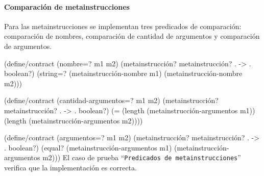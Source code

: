 \documentclass[10pt,oneside,openany,letterpaper]{book}
\begin{document}
\paragraph{Comparación de metainstrucciones} Para las metainstrucciones se implementan tres predicados de comparación: comparación de nombres, comparación de cantidad de argumentos y comparación de argumentos.

\nwenddocs{}\endmoddef
(define/contract (nombre=? m1 m2)
  (metainstrucción? metainstrucción? . -> . boolean?)
  (string=? (metainstrucción-nombre m1)
            (metainstrucción-nombre m2)))

(define/contract (cantidad-argumentos=? m1 m2)
  (metainstrucción? metainstrucción? . -> . boolean?)
  (= (length (metainstrucción-argumentos m1))
     (length (metainstrucción-argumentos m2))))

(define/contract (argumentos=? m1 m2)
  (metainstrucción? metainstrucción? . -> . boolean?)
  (equal? (metainstrucción-argumentos m1)
          (metainstrucción-argumentos m2)))
\eatline
{}\nwendcode{}\nwdocspar
El caso de prueba ``{\tt{}Predicados\ de\ \protect{}metainstrucciones}'' verifica que la implementación es correcta.
\end{document}

